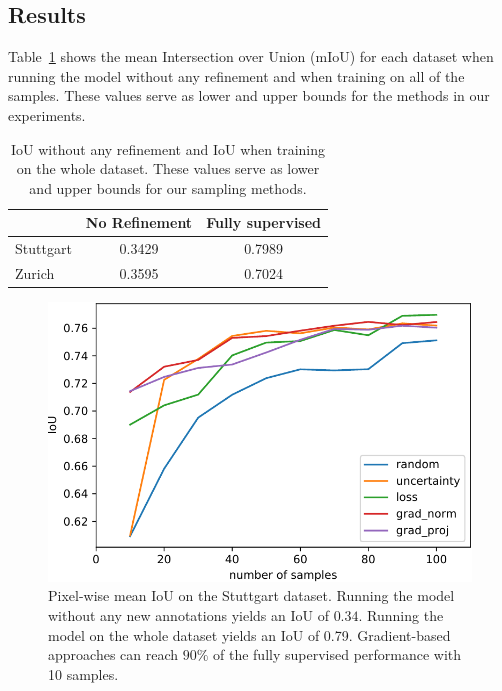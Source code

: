 \documentclass[letterpaper, 10 pt, conference]{ieeeconf}  %
\begin{document}


\subsection{Results}


Table~\ref{tab:null_and_fully_supervised} shows the mean Intersection over Union (mIoU) for each dataset when running the model without any refinement and when training on all of the samples. These values serve as lower and upper bounds for the methods in our experiments.

            \begin{table}
          \vspace{1em}
        \centering
        \caption{IoU without any refinement and IoU when training on the whole dataset. These values serve as lower and upper bounds for our sampling methods.}
        \begin{tabular}{@{}lcc@{}} 
            \toprule
              &  No Refinement  & Fully supervised \\ 
            \midrule 
    		  Stuttgart  & 0.3429 & 0.7989  \\ \addlinespace
    		  Zurich  & 0.3595 & 0.7024  \\
    	
            \bottomrule
        \end{tabular}
        \label{tab:null_and_fully_supervised}
    \end{table}


    \begin{figure}
    \centering
    \includegraphics[width=0.88\linewidth]{pics/pw_iou_stuttgart-crop.pdf}
   		\caption{Pixel-wise mean IoU on the Stuttgart dataset. Running the model without any new annotations yields an IoU of $0.34$. Running the model on the whole dataset yields an IoU of 0.79. Gradient-based approaches can reach $90\%$ of the fully supervised performance with 10 samples.}
		\label{fig:iou_stuttgart}    		
   \end{figure}
   
\end{document}
